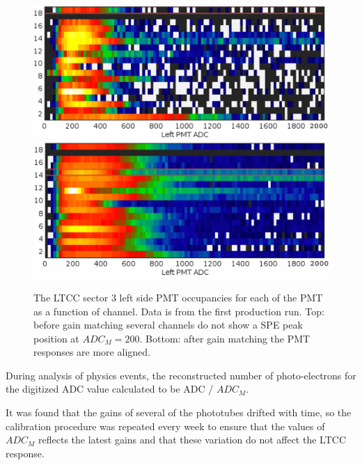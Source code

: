 \begin{figure}
	\centering
	\includegraphics[width=0.95\columnwidth,keepaspectratio]{img/gainMatchingBefore.png}
	\includegraphics[width=0.95\columnwidth,keepaspectratio]{img/gainMatchingAfter.png}
\caption{The LTCC sector 3 left side PMT occupancies for each of the PMT as a function of channel. Data is from the first production run. Top: before gain matching
		   several channels do not show a SPE peak position at  $ADC_M = 200$. Bottom: after gain matching the PMT responses are more aligned.}
	\label{fig:gainMatching}
\end{figure}

During analysis of physics events, the reconstructed number of photo-electrons for the digitized ADC value calculated to be ADC / $ADC_M$.

It was found that the gains of several of the phototubes drifted with time, so the calibration procedure was repeated every week to ensure that
the values of $ADC_M$ reflects the latest gains and that these variation do not affect the LTCC response.



